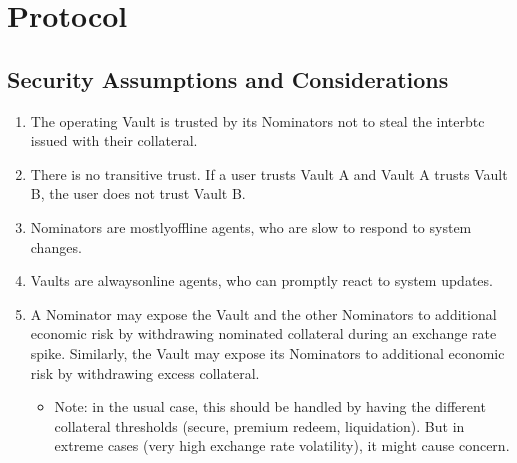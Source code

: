 \documentclass[a4paper,10pt,english]{sphinxmanual}
\begin{document}
\section{Protocol}
\label{\detokenize{spec/nomination:protocol}}

\subsection{Security Assumptions and Considerations}
\label{\detokenize{spec/nomination:security-assumptions-and-considerations}}\begin{enumerate}
%
\item {} 
The operating Vault is trusted by its Nominators not to steal the interbtc issued with their collateral.

\item {} 
There is no transitive trust. If a user trusts Vault A and Vault A trusts Vault B, the user does not trust Vault B.

\item {} 
Nominators are mostly\sphinxhyphen{}offline agents, who are slow to respond to system changes.

\item {} 
Vaults are always\sphinxhyphen{}online agents, who can promptly react to system updates.

\item {} 
A Nominator may expose the Vault and the other Nominators to additional economic risk by withdrawing nominated collateral during an exchange rate spike. Similarly, the Vault may expose its Nominators to additional economic risk by withdrawing excess collateral.
\begin{itemize}
\item {} 
Note: in the usual case, this should be handled by having the different collateral thresholds (secure, premium redeem, liquidation). But in extreme cases (very high exchange rate volatility), it might cause concern.

\end{itemize}

\end{enumerate}
\end{document}
